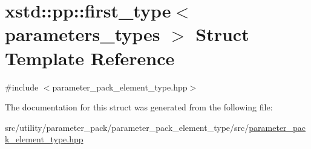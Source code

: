 \hypertarget{structxstd_1_1pp_1_1first__type}{\section{xstd\-:\-:pp\-:\-:first\-\_\-type$<$ parameters\-\_\-types $>$ Struct Template Reference}
\label{structxstd_1_1pp_1_1first__type}
}


{\ttfamily \#include $<$parameter\-\_\-pack\-\_\-element\-\_\-type.\-hpp$>$}



The documentation for this struct was generated from the following file\-:\begin{DoxyCompactItemize}
\item 
src/utility/parameter\-\_\-pack/parameter\-\_\-pack\-\_\-element\-\_\-type/src/\hyperlink{parameter__pack__element__type_8hpp}{parameter\-\_\-pack\-\_\-element\-\_\-type.\-hpp}\end{DoxyCompactItemize}
